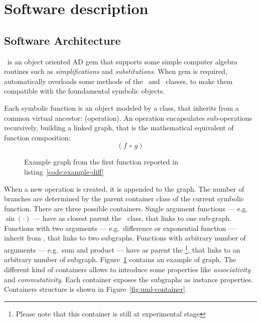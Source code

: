 \section{Software description}
\label{sec:description}


\subsection{Software Architecture}
\label{sec:architecture}


\ragnicas~is an object oriented AD gem that supports some simple computer algebra routines such as \emph{simplifications} and \emph{substitutions}. When gem is required, automatically overloads some methods of the \Fixnum~and \Float~classes, to make them compatible with the foundamental symbolic objects.

Each symbolic function is an object modeled by a class, that inherits from a common virtual ancestor: \CASOp (operation). An operation encapsulates sub-operations recursively, building a linked graph, that is the mathematical equivalent of function composition:
\begin{equation}
\left( f \, \circ \, g \right)
\end{equation}

\begin{figure}[ht!]
\label{fig:graph}
\centering

\caption{Example graph from the first function reported in listing~\ref{code:example-diff}}
\end{figure}

When a new operation is created, it is appended to the graph. The number of branches are determined by the parent container class of the current symbolic function. There are three possible containers. Single argument functions --- e.g. $\sin(\cdot)$ --- have as closest parent the \CASOp~class, that links to one sub-graph. Functions with two arguments --- e.g.\ difference or exponential function --- inherit from \CASBinaryOp, that links to two subgraphs. Functions with arbitrary number of arguments --- e.g.\ sum and product --- have as parent the \CASNaryOp\footnote{Please note that this container is still at experimental stage}, that links to an arbitrary number of subgraph. Figure~\ref{fig:graph} contains an example of graph. The different kind of containers allows to introduce some properties like \emph{associativity} and \emph{commutativity}. Each container exposes the subgraphs as instance properties. Containers structure is shown in Figure~\ref{fig:uml-container}.

